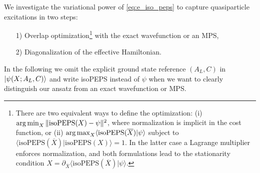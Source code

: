 We investigate the variational power of \eqref{eq:e_iso_peps} to capture quasiparticle excitations in two steps: 
\begin{enumerate}
	\item[1)] \vspace*{-0.15em} Overlap optimization\footnote{There are two equivalent ways to define the optimization: (i) $\operatorname*{arg\,min}_X \Vert \text{isoPEPS}(X) - \psi \Vert^2$, where normalization is implicit in the cost function, or (ii) $\operatorname*{arg\,max}_X \langle \text{isoPEPS}(\overline{X})\vert \psi \rangle$ subject to $\langle \text{isoPEPS}(\overline{X})\vert \text{isoPEPS}(X)\rangle = 1$. In the latter case a Lagrange multiplier enforces normalization, and both formulations lead to the stationarity condition $X = \partial_{\overline{X}} \langle \text{isoPEPS}(\overline{X}) \vert \psi \rangle$.} with the exact wavefunction or an MPS, 
	\item[2)] \vspace*{-0.5em} Diagonalization of the effective Hamiltonian. 
\end{enumerate}
\vspace*{-0.15em}
In the following we omit the explicit ground state reference $(A_L, C)$ in $\ket{\psi(X; A_L, C)} $ and write isoPEPS instead of $\psi$ when we want to clearly distinguish our ansatz from an exact wavefunction or MPS. \\[0.3em]

